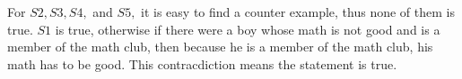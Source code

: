 \begin{multicols}{2}
\begin{figure}[H]
		\vspace*{-10pt}
	\end{figure}	
	For $S2,S3, S4,$ and $S5,$ it is easy to find a counter example, thus none of them is true.
	$S1$ is true, otherwise if there were a boy whose math is not good and is a member of the math club,
	then because he is a member of the math club, his math has to be good. This contracdiction means the statement is true.
\end{multicols}